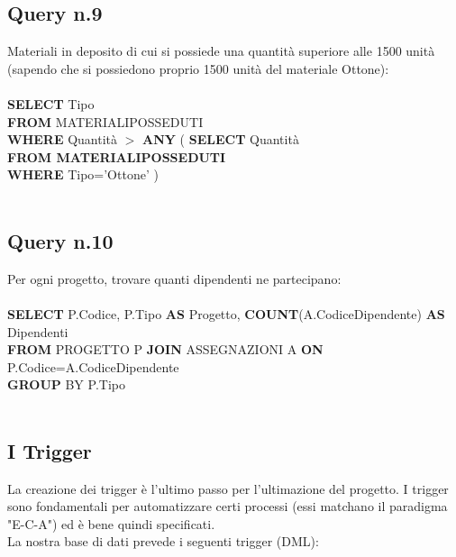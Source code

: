 \documentclass[a4paper,12pt,italian]{article}
\begin{document}
\subsection*{Query n.9}
Materiali in deposito di cui si possiede una quantità superiore alle 1500 unità (sapendo che si possiedono proprio 1500 unità del materiale Ottone): \\ \\
\textbf{SELECT} Tipo \\
\textbf{FROM} MATERIALIPOSSEDUTI \\
\textbf{WHERE} Quantità \begin{math} > \end{math} \textbf{ANY} ( \textbf{SELECT} Quantità \\
		                 \textbf{FROM MATERIALIPOSSEDUTI} \\	
			      \textbf{WHERE} Tipo=’Ottone’ ) \\ \\

\subsection*{Query n.10}
Per ogni progetto, trovare quanti dipendenti ne partecipano: \\ \\
\textbf{SELECT} P.Codice, P.Tipo \textbf{AS} Progetto, \textbf{COUNT}(A.CodiceDipendente) \textbf{AS} Dipendenti \\
\textbf{FROM} PROGETTO P \textbf{JOIN} ASSEGNAZIONI A \textbf{ON} P.Codice=A.CodiceDipendente \\	 
\textbf{GROUP} BY P.Tipo \\ \\

\subsection{I Trigger}
La creazione dei trigger è l'ultimo passo per l'ultimazione del progetto. I trigger sono fondamentali per automatizzare certi processi (essi matchano il paradigma "E-C-A") ed è bene quindi specificati. \\
La nostra base di dati prevede i seguenti trigger (DML):
\end{document}

